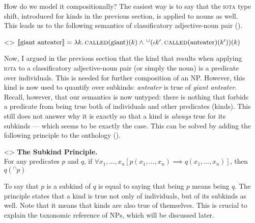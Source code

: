 \documentclass[a4paper, 12pt]{article}
\begin{document}
How do we model it compositionally? The easiest way is to say that the \textsc{iota} type shift, introduced for kinds in the previous section, is applied to nouns as well. This leads us to the following semantics of classificatory adjective-noun pair (\nextx).

\ex<>
$\llbracket \text{giant anteater} \rrbracket = \lambda k.\, \textsc{called}(\text{giant})(k)\land \,^\cup(\iota k'.\, \textsc{called}(\text{anteater})(k'))(k)$\footnotemark
\xe


Now, I argued in the previous section that the kind that results when applying \textsc{iota} to a classificatory adjective-noun pair (or simply the noun) is a predicate over individuals. This is needed for further composition of an NP. However, this kind is now used to quantify over subkinds: \textit{anteater} is true of \textit{giant anteater}. Recall, however, that our semantics is now untyped: there is nothing that forbids a predicate from being true both of individuals and other predicates (kinds). This still does not answer why it is exactly so that a kind is \emph{always} true for its subkinds --- which seems to be exactly the case. This can be solved by adding the following principle to the onthology (\nextx).

\ex<>
    \textbf{The Subkind Principle.}\\For any predicates $p$ and $q$, if $\forall x_1,...,x_n[p(x_1,...,x_n)\implies q(x_1,...,x_n)]$, then $q(^\cap p)$\footnotemark{}
\xe


To say that $p$ is a subkind of $q$ is equal to saying that being $p$ means being $q$. The principle states that a kind is true not only of individuals, but of its subkinds as well. Note that it means that kinds are also true of themselves. This is crucial to explain the taxonomic reference of NPs, which will be discussed later.
\end{document}

